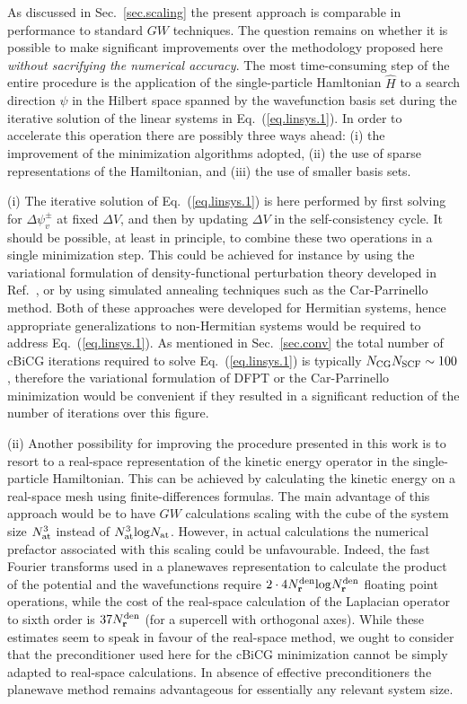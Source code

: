 \documentclass[twocolumn,prb,showpacs,superscriptaddress]{revtex4}
\def\H{\hat{H}}
\def\r{{\bf r}}
\begin{document}
As discussed in Sec.\ \ref{sec.scaling} the present approach is comparable
in performance to standard\cite{hl86} $GW$ techniques.
The question remains on whether it is possible to make significant
improvements over the methodology proposed here {\it without sacrifying
the numerical accuracy}. The most time-consuming
step of the entire procedure is the application of the single-particle
Hamltonian $\H$ to a search direction $\psi$ in the Hilbert space spanned
by the wavefunction basis set during the iterative solution 
of the linear systems in Eq.\ (\ref{eq.linsys.1}). In order to accelerate
this operation there are possibly three ways ahead: (i) the improvement of the
minimization algorithms adopted, (ii) the use of sparse representations of
the Hamiltonian, and (iii) the use of smaller basis sets. 

(i) The iterative solution of Eq.\ (\ref{eq.linsys.1}) is here performed
by first solving for $\Delta\psi_v^\pm$ at fixed $\Delta V$, and then 
by updating $\Delta V$ in the self-consistency cycle.
It should be possible, at least in principle, to combine these two
operations in a single minimization step. This could be achieved
for instance by using the variational formulation of density-functional
perturbation theory developed in Ref.\ ,
or by using simulated annealing techniques such as the Car-Parrinello 
method.\cite{carparrinello} Both of these approaches were developed
for Hermitian systems, hence appropriate generalizations
to non-Hermitian systems would be required to address Eq.\ (\ref{eq.linsys.1}).
As mentioned in Sec.\ \ref{sec.conv} the total number of cBiCG iterations
required to solve Eq.\ (\ref{eq.linsys.1}) is typically 
$N_{\rm CG} N_{\rm SCF}\sim 100$, therefore the variational formulation
of DFPT or the Car-Parrinello minimization would be convenient
if they resulted in a significant reduction of the number of iterations
over this figure.

(ii) Another possibility for improving the procedure presented in this work
is to resort to a real-space representation of the kinetic energy operator
in the single-particle Hamiltonian. This can be achieved by
calculating the kinetic energy on a real-space mesh using finite-differences
formulas.\cite{chelikowsky} The main advantage of this approach would be
to have $GW$ calculations scaling with the cube of the system size
$N_{\rm at}^3$ instead of $N_{\rm at}^3 {\rm log} N_{\rm at}$.
However, in actual calculations the numerical prefactor associated with this scaling
could be unfavourable. Indeed, the fast Fourier transforms used in a planewaves
representation to calculate the product of the potential and the wavefunctions
require $2\cdot 4 N_\r^{\rm den} {\rm log} N_\r^{\rm den}$ floating point operations,
while the cost of the real-space calculation of the Laplacian operator
to sixth order is $37 N_\r^{\rm den}$
(for a supercell with orthogonal axes).\cite{chelikowsky} 
While these estimates seem to speak in favour of the real-space method,
we ought to consider that the preconditioner used here\cite{tpa} for the 
cBiCG minimization cannot be simply adapted to real-space calculations.
In absence of effective preconditioners the planewave method
remains advantageous for essentially any relevant system size.
\end{document}
